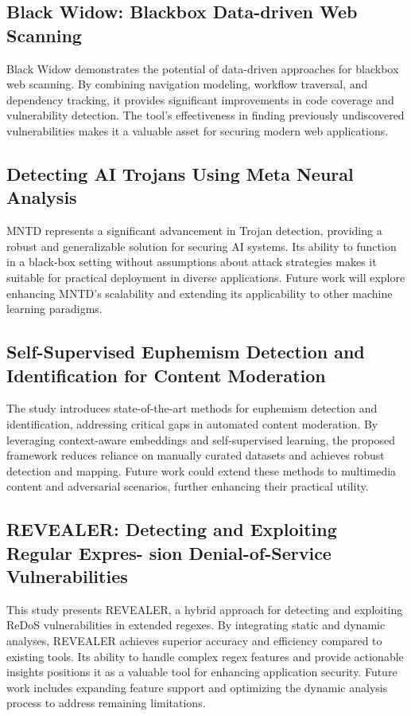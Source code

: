 \documentclass[conference]{IEEEtran}
\begin{document}
\subsection{\textbf{Black Widow: Blackbox Data-driven Web Scanning}}
Black Widow demonstrates the potential of data-driven approaches for blackbox web scanning. By combining navigation modeling, workflow traversal, and dependency tracking, it provides significant improvements in code coverage and vulnerability detection. The tool's effectiveness in finding previously undiscovered vulnerabilities makes it a valuable asset for securing modern web applications.

\subsection{\textbf{Detecting AI Trojans Using Meta Neural Analysis}}
MNTD represents a significant advancement in Trojan detection, providing a robust and generalizable solution for securing AI systems. Its ability to function in a black-box setting without assumptions about attack strategies makes it suitable for practical deployment in diverse applications. Future work will explore enhancing MNTD's scalability and extending its applicability to other machine learning paradigms.
\subsection{\textbf{Self-Supervised Euphemism Detection and Identification for Content Moderation}}
The study introduces state-of-the-art methods for euphemism detection and identification, addressing critical gaps in automated content moderation. By leveraging context-aware embeddings and self-supervised learning, the proposed framework reduces reliance on manually curated datasets and achieves robust detection and mapping. Future work could extend these methods to multimedia content and adversarial scenarios, further enhancing their practical utility.
\subsection{\textbf{REVEALER: Detecting and Exploiting Regular Expres-
sion Denial-of-Service Vulnerabilities}}
This study presents REVEALER, a hybrid approach for detecting and exploiting ReDoS vulnerabilities in extended regexes. By integrating static and dynamic analyses, REVEALER achieves superior accuracy and efficiency compared to existing tools. Its ability to handle complex regex features and provide actionable insights positions it as a valuable tool for enhancing application security. Future work includes expanding feature support and optimizing the dynamic analysis process to address remaining limitations.
\end{document}
